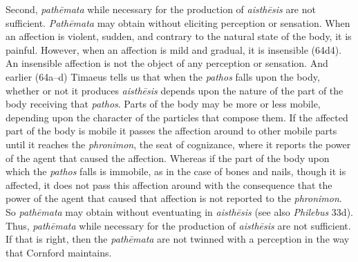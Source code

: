 Second, \emph{pathēmata} while necessary for the production of \emph{aisthēsis} are not sufficient. \emph{Pathēmata} may obtain without eliciting perception or sensation. When an affection is violent, sudden, and contrary to the natural state of the body, it is painful. However, when an affection is mild and gradual, it is insensible (64d4). An insensible affection is not the object of any perception or sensation. And earlier (64a--d) Timaeus tells us that when the \emph{pathos} falls upon the body, whether or not it produces \emph{aisthēsis} depends upon the nature of the part of the body receiving that \emph{pathos}. Parts of the body may be more or less mobile, depending upon the character of the particles that compose them. If the affected part of the body is mobile it passes the affection around to other mobile parts until it reaches the \emph{phronimon}, the seat of cognizance, where it reports the power of the agent that caused the affection. Whereas if the part of the body upon which the \emph{pathos} falls is immobile, as in the case of bones and nails, though it is affected, it does not pass this affection around with the consequence that the power of the agent that caused that affection is not reported to the \emph{phronimon}. So \emph{pathēmata} may obtain without eventuating in \emph{aisthēsis} (see also \emph{Philebus} 33d). Thus, \emph{pathēmata} while necessary for the production of \emph{aisthēsis} are not sufficient. If that is right, then the \emph{pathēmata} are not twinned with a perception in the way that Cornford maintains.

